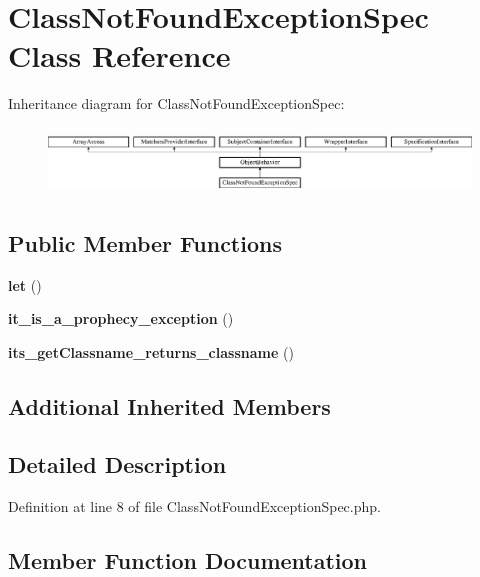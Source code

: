 \section{Class\+Not\+Found\+Exception\+Spec Class Reference}
\label{classspec_1_1_prophecy_1_1_exception_1_1_doubler_1_1_class_not_found_exception_spec}
Inheritance diagram for Class\+Not\+Found\+Exception\+Spec\+:\begin{figure}[H]
\begin{center}
\leavevmode
\includegraphics[height=1.768421cm]{classspec_1_1_prophecy_1_1_exception_1_1_doubler_1_1_class_not_found_exception_spec}
\end{center}
\end{figure}
\subsection*{Public Member Functions}
\begin{DoxyCompactItemize}
\item 
{\bf let} ()
\item 
{\bf it\+\_\+is\+\_\+a\+\_\+prophecy\+\_\+exception} ()
\item 
{\bf its\+\_\+get\+Classname\+\_\+returns\+\_\+classname} ()
\end{DoxyCompactItemize}
\subsection*{Additional Inherited Members}


\subsection{Detailed Description}


Definition at line 8 of file Class\+Not\+Found\+Exception\+Spec.\+php.



\subsection{Member Function Documentation}
